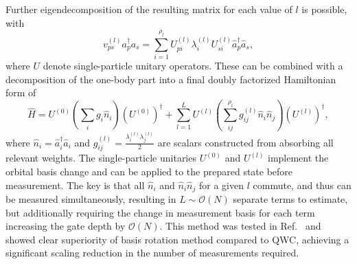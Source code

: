 Further eigendecomposition of the resulting matrix for each value of $l$ is possible, with
\begin{equation}
    v_{ps}^{(l)} a_p^{\dagger} a_s = \sum_{i=1}^{\rho_l} U_{pi}^{(l)} \lambda_i^{(l)} U_{si}^{(l)} \hat{a}_p^{\dagger} \hat{a}_s ,
\end{equation}
where $U$ denote single-particle unitary operators.
These can be combined with a decomposition of the one-body part into a final doubly factorized Hamiltonian form of
\begin{equation}
    \hat{H} = U^{(0)} \left( \sum_i g_i \hat{n}_i \right) (U^{(0)})^{\dagger} + \sum_{l=1}^L U^{(l)} \left( \sum_{ij}^{\rho_l} g_{ij}^{(l)}\hat{n}_i \hat{n}_j\right)(U^{(l)})^{\dagger},
\end{equation}
where $\hat{n}_i = \hat{a}_i^{\dagger} \hat{a}_i$ and $g_{ij}^{(l)}=\frac{\lambda_i^{(l)} \lambda_j^{(l)}}{2}$ are scalars constructed from absorbing all relevant weights. The single-particle unitaries $U^{(0)}$ and  $U^{(l)}$ implement the orbital basis change and can be applied to the prepared state before measurement. 
The key is that all $\hat{n}_i$ and $\hat{n}_i \hat{n}_j$ for a given $l$ commute, and thus can be measured simultaneously, resulting in $L \sim \mathcal{O}(N)$ separate terms to estimate, but additionally requiring the change in measurement basis for each term increasing the gate depth by $\mathcal{O}(N)$. This method was tested in Ref.~\cite{Gonthier2020} and showed clear superiority of basis rotation method compared to QWC, achieving a significant scaling reduction in the number of measurements required. 



